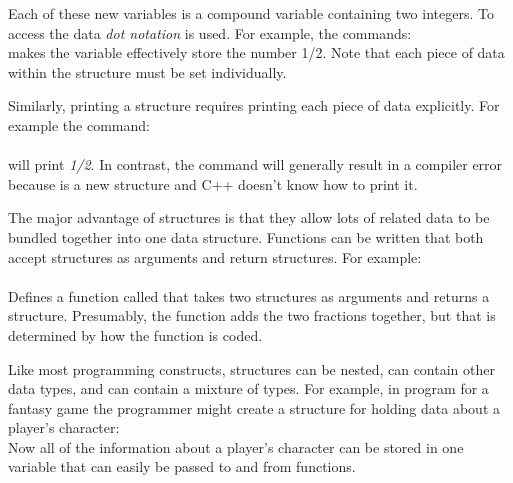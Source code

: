 Each of these new variables is a compound variable containing two integers.  To access the data \emph{dot notation} is used.  For example, the commands:\\
makes the variable  effectively store the number 1/2.  Note that each piece of data within the structure must be set individually.

Similarly, printing a structure requires printing each piece of data explicitly.  For example the command: \\
\\
will print \emph{1/2}.  In contrast, the command  will generally result in a compiler error because  is a new structure and C++ doesn't know how to print it.

The major advantage of structures is that they allow lots of related data to be bundled together into one data structure.
Functions can be written that both accept structures as arguments and return structures.  For example:\\
\\
Defines a function called  that takes two  structures as arguments and returns a  structure.  Presumably, the function adds the two fractions together, but that is determined by how the function is coded.

Like most programming constructs, structures can be nested, can contain other data types, and can contain a mixture of types.  For example, in program for a fantasy game the programmer might create a structure for holding data about a player's character:\\
Now all of the information about a player's character can be stored in one variable that can easily be passed to and from functions.

